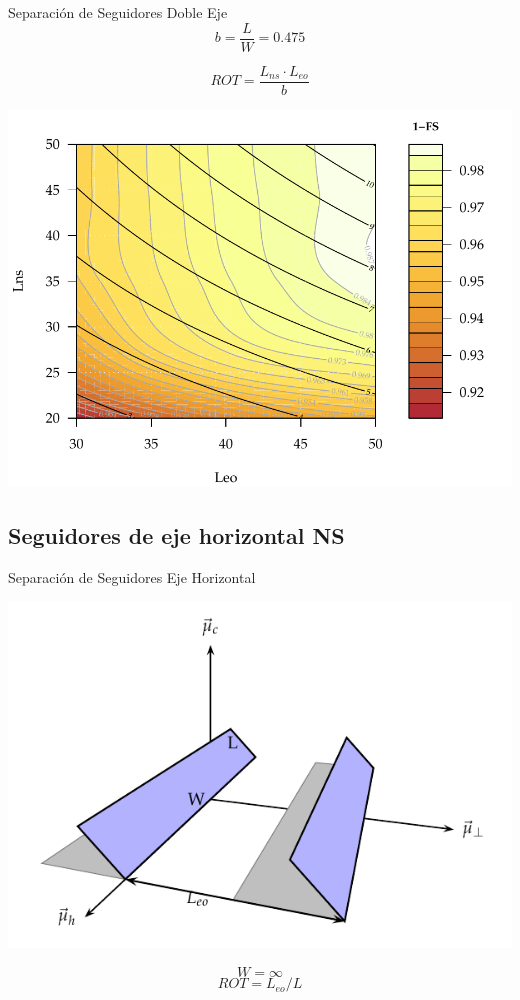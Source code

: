 \documentclass[xcolor={usenames,svgnames,dvipsnames}]{beamer}
\begin{document}
\begin{frame}[label={sec:org04fd5c5}]{Separación de Seguidores Doble Eje}
$$b=\frac{L}{W}=0.475$$

$$ROT=\frac{L_{ns}\cdot L_{eo}}{b}$$

\begin{center}
\includegraphics[width=.9\linewidth]{../figs/AbacoSeguidor2X_Ene10.pdf}
\end{center}
\end{frame}


\subsection{Seguidores de eje horizontal NS}
\label{sec:orgca15f7f}

\begin{frame}[label={sec:org0c03306}]{Separación de Seguidores Eje Horizontal}
\begin{center}
\includegraphics[width=.9\linewidth]{../figs/SombrasHoriz.pdf}
\end{center}

$$W=\infty$$ $$ROT=L_{eo}/L$$
\end{frame}
\end{document}
